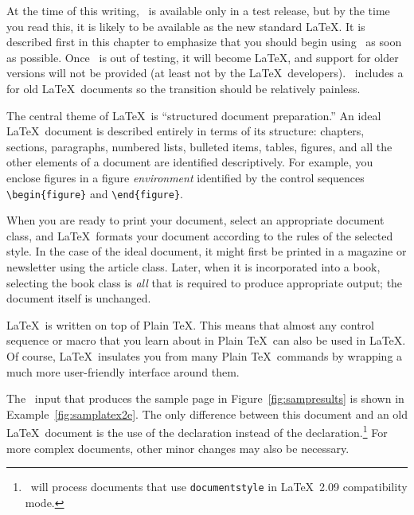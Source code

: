 \begin{sidebar}
At the time of this writing, \LaTeXe\ is available only in a test release, but
by the time you read this, it is likely to be available as the new standard
\LaTeX.  It is described first in this chapter to emphasize that you
should begin using \LaTeXe\ as soon as possible.  Once \LaTeXe\ is out of
testing, it will become \LaTeX, and support for older versions will not be
provided (at least not by the \LaTeX\ developers).  \LaTeXe\ includes a
 for 
old \LaTeX\ documents so the transition should be
relatively painless.
\end{sidebar}

The central theme of \LaTeX\ is ``structured document preparation.''  An
ideal \LaTeX\ document is described entirely in terms of its structure:
chapters, sections, paragraphs, numbered lists, bulleted items, tables,
figures, and all the other elements of a document are
identified descriptively.  For example, you enclose figures in a figure
\textit{environment} identified by the control sequences 
\verb|\begin{figure}| and \verb|\end{figure}|.

When you are ready to print your document, select an appropriate document
class, and \LaTeX\ formats 
your document according to the rules of the
selected style.  In the case of the ideal document, it might first be printed
in a magazine or newsletter using the article class.  Later, when it is
incorporated into a book, selecting the book class is {\em all\/} that is
required to produce appropriate output; the document itself is unchanged.

\LaTeX\ is written on top of Plain \TeX.  This means that almost any control
sequence  or 
macro that you learn about in Plain \TeX\ can also be used in
\LaTeX.  Of course, \LaTeX\ insulates you from many Plain \TeX\ commands by
wrapping a much more user-friendly interface around them.

The \LaTeXe\ input that produces the sample page in
Figure~\ref{fig:sampresults} is shown in Example~\ref{fig:samplatex2e}.
The only difference between this document and an old \LaTeX\ document is
the use of the  declaration instead of the
 declaration.\footnote{\LaTeXe\ will process
documents that use \texttt{\ttbackslash documentstyle} in \LaTeX\ 2.09
compatibility mode.}  For more complex documents, other minor
changes may also be necessary.

